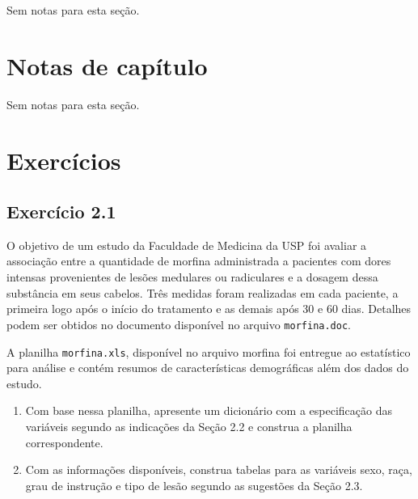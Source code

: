\documentclass[
]{latex/krantz}
\providecommand{\tightlist}{%
  \setlength{\itemsep}{0pt}\setlength{\parskip}{0pt}}
\theoremstyle{definition}
\theoremstyle{definition}
\theoremstyle{definition}
\theoremstyle{definition}
\theoremstyle{remark}
\begin{document}
Sem notas para esta seção.

\hypertarget{notas-de-capuxedtulo}{%
\section{Notas de capítulo}\label{notas-de-capuxedtulo}}

Sem notas para esta seção.

\hypertarget{exercuxedcios}{%
\section{Exercícios}\label{exercuxedcios}}

\hypertarget{exr2-1}{%
\subsection*{Exercício 2.1}\label{exr2-1}}

O objetivo de um estudo da Faculdade de Medicina da USP foi avaliar a associação entre a quantidade de morfina administrada a pacientes com dores intensas provenientes de lesões medulares ou radiculares e a dosagem dessa substância em seus cabelos. Três medidas foram realizadas em cada paciente, a primeira logo após o início do tratamento e as demais após 30 e 60 dias. Detalhes podem ser obtidos no documento disponível no arquivo \texttt{morfina.doc}.

A planilha \texttt{morfina.xls}, disponível no arquivo morfina foi entregue ao estatístico para análise e contém resumos de características demográficas além dos dados do estudo.

\begin{enumerate}
\def\labelenumi{\alph{enumi})}
\tightlist
\item
  Com base nessa planilha, apresente um dicionário com a especificação das variáveis segundo as indicações da Seção 2.2 e construa a planilha correspondente.
\item
  Com as informações disponíveis, construa tabelas para as variáveis sexo, raça, grau de instrução e tipo de lesão segundo as sugestões da Seção 2.3.
\end{enumerate}
\end{document}
